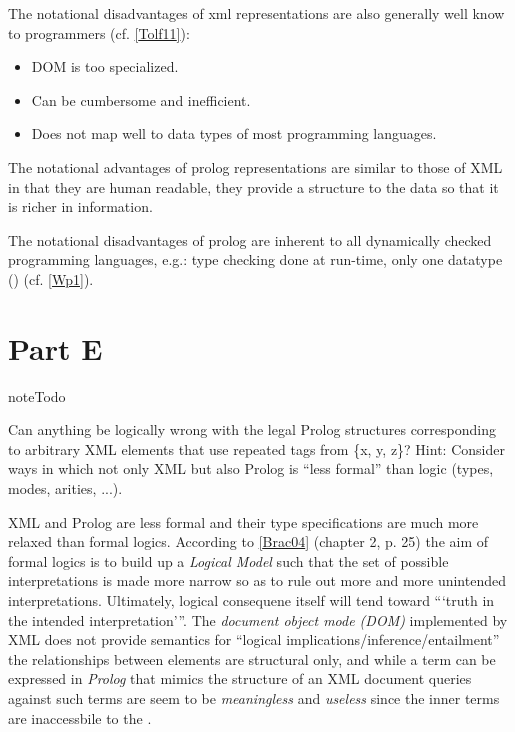 \documentclass[letterpaper,10pt,english]{sphinxmanual}
\begin{document}
The notational disadvantages of xml representations are also generally well know to programmers (cf. {\hyperref[assign0:tolf11]{{[}Tolf11{]}}}):
\begin{itemize}
\item {} 
DOM is too specialized.

\item {} 
Can be cumbersome and inefficient.

\item {} 
Does not map well to data types of most programming languages.

\end{itemize}

The notational advantages of prolog representations are similar to those of XML in that they are human readable, they provide a structure to the data so that it is richer in information.

The notational disadvantages of prolog are inherent to all dynamically checked programming languages, e.g.: type checking done at run-time, only one datatype () (cf. {\hyperref[assign0:wp1]{{[}Wp1{]}}}).


\section{Part E}
\label{assign0:part-e}
\begin{notice}{note}{Todo}

Can anything be logically wrong with the legal Prolog structures corresponding to arbitrary XML elements that use repeated tags from \{x, y, z\}? Hint: Consider ways in which not only XML but also Prolog is ``less formal'' than logic (types, modes, arities, ...).
\end{notice}

XML and Prolog are less formal and their type specifications are much more relaxed than formal logics.  According to {\hyperref[assign0:brac04]{{[}Brac04{]}}} (chapter 2, p. 25) the aim of formal logics is to build up a \emph{Logical Model} such that the set of possible interpretations is made more narrow
so as to rule out more and more unintended interpretations.
Ultimately, logical consequene itself will tend toward ```truth in the intended interpretation'''.
The \emph{document object mode (DOM)} implemented by XML does not provide semantics for ``logical implications/inference/entailment'' the relationships between elements are structural only, and while a term can be expressed in \emph{Prolog} that mimics the structure of an
XML document queries against such terms are seem to be \emph{meaningless} and \emph{useless} since the inner terms are inaccessbile to the .
\end{document}
